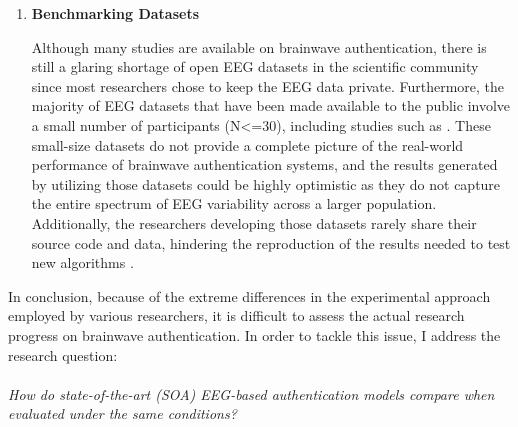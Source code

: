 \begin{enumerate}
\item \textbf{\large Benchmarking Datasets} 
\smallskip
 
Although many studies are available on brainwave authentication, there is still a glaring shortage of open EEG datasets in the scientific community since most researchers chose to keep the EEG data private. Furthermore, the majority of EEG datasets that have been made available to the public involve a small number of participants (N<=30), including studies such as \cite{simoes2020bciaut, hubner2017learning, guger2009many_paper, toffolo2022evoking}. These small-size datasets do not provide a complete picture of the real-world performance of brainwave authentication systems, and the results generated by utilizing those datasets could be highly optimistic as they do not capture the entire spectrum of EEG variability across a larger population. Additionally, the researchers developing those datasets rarely share their source code and data, hindering the reproduction of the results needed to test new algorithms \cite{moabb}.  
\end{enumerate}
In conclusion, because of the extreme differences in the experimental approach employed by various researchers, it is difficult to assess the actual research progress on brainwave authentication. In order to tackle this issue, I address the research question:
\\
\\
\textit{How do state-of-the-art (SOA) EEG-based authentication models compare when evaluated under the same conditions?}   
\smallskip

